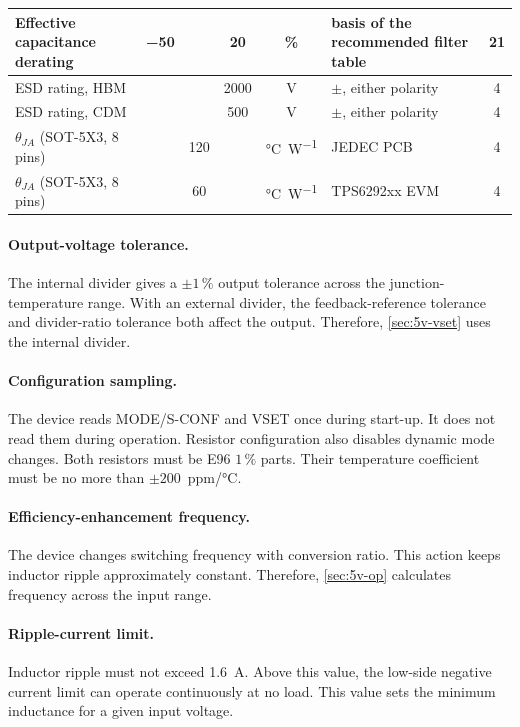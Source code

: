 {\begin{longtable}{|L{4.4cm}|c|c|c|c|L{3.6cm}|c|}
\hline
Effective capacitance derating & \num{-50} & & \num{20} & \% & basis of the recommended filter table & 21 \\
\hline
ESD rating, HBM & & & \num{2000} & \si{\volt} & $\pm$, either polarity & 4 \\
\hline
ESD rating, CDM & & & \num{500} & \si{\volt} & $\pm$, either polarity & 4 \\
\hline
\(\theta_{JA}\) (SOT-5X3, 8 pins) & & \num{120} & & \si{\celsius\per\watt} & JEDEC PCB & 4 \\
\hline
\(\theta_{JA}\) (SOT-5X3, 8 pins) & & \num{60} & & \si{\celsius\per\watt} & TPS6292xx EVM & 4 \\
\hline
\end{longtable}
}

\paragraph{Output-voltage tolerance.} The internal divider gives a
$\pm1\,\%$ output tolerance across the junction-temperature range. With an
external divider, the feedback-reference tolerance and divider-ratio tolerance
both affect the output. Therefore, \cref{sec:5v-vset} uses the internal divider.

\paragraph{Configuration sampling.} The device reads MODE/S-CONF and VSET once
during start-up. It does not read them during operation. Resistor configuration
also disables dynamic mode changes. Both resistors must be E96 $1\,\%$ parts.
Their temperature coefficient must be no more than
$\pm200$~ppm/\si{\celsius}.

\paragraph{Efficiency-enhancement frequency.} The device changes switching
frequency with conversion ratio. This action keeps inductor ripple approximately
constant. Therefore, \cref{sec:5v-op} calculates frequency across the input
range.

\paragraph{Ripple-current limit.} Inductor ripple must not exceed
\SI{1.6}{\ampere}. Above this value, the low-side negative current limit can
operate continuously at no load. This value sets the minimum inductance for a
given input voltage.

